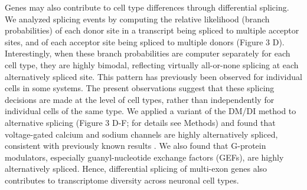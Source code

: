 Genes may also contribute to cell type differences through differential splicing. We analyzed splicing events by computing the relative likelihood (branch probabilities) of each donor site in a transcript being spliced to multiple acceptor sites, and of each acceptor site being spliced to multiple donors (Figure 3 D). Interestingly, when these branch probabilities are computer separately for each cell type, they are highly bimodal, reflecting virtually all-or-none splicing at each alternatively spliced site. This pattern has previously been observed for individual cells in some systems\cite{Shalek_2013}. The present observations suggest that these splicing decisions are made at the level of  cell types, rather than independently for individual cells of the same type. We applied a variant of the DM/DI method to alternative splicing (Figure 3 D-F; for details see Methods) and found that voltage-gated calcium and sodium channels are highly alternatively spliced, consistent with previously known results \citep[e.g.][]{Lipscombe_2013}. We also found that G-protein modulators, especially guanyl-nucleotide exchange factors (GEFs), are highly alternatively spliced. Hence, differential splicing of multi-exon genes also contributes to transcriptome diversity across neuronal cell types.























